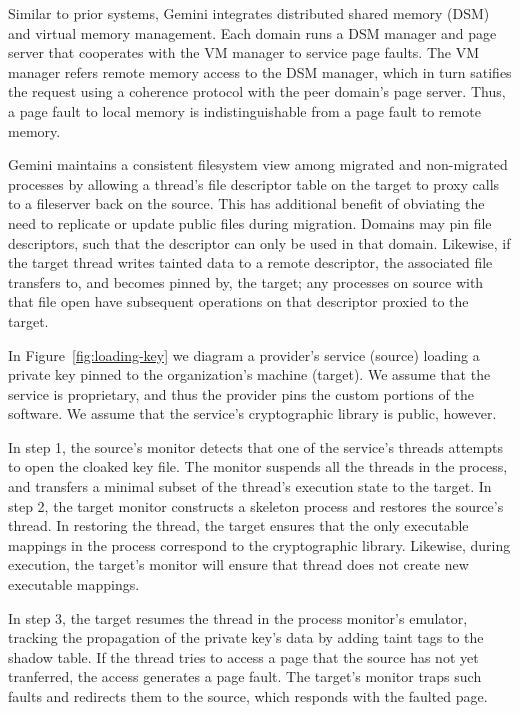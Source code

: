 %
Similar to prior systems, Gemini integrates distributed shared memory (DSM) and
virtual memory management.
%
Each domain runs a DSM manager and page server that cooperates with the VM
manager to service page faults.
%
The VM manager refers remote memory access to the DSM manager,
which in turn satifies the request using a coherence protocol with the peer
domain's page server.
%
Thus, a page fault to local memory is indistinguishable from a page fault to
remote memory.


%
Gemini maintains a consistent filesystem view among migrated and
non-migrated processes by allowing a thread's file descriptor table on the
target to proxy calls to a fileserver back on the source.
%
This has additional benefit of obviating the need to replicate or update
public files during migration.
%
Domains may pin file descriptors, such that the descriptor can only be used
in that domain.
%
Likewise, if the target thread writes tainted data to a remote descriptor, the
associated file transfers to, and becomes pinned by, the target; any processes
on source with that file open have subsequent operations on that descriptor
proxied to the target.


%
In Figure~\ref{fig:loading-key} we diagram a provider's service (source) loading
a private key pinned to the organization's machine (target).
%
We assume that the service is proprietary, and thus the provider
pins the custom portions of the software.
%
We assume that the service's cryptographic library is public, however.


In step 1, the source's monitor detects that one of the service's threads
attempts to open the cloaked key file.
%
The monitor suspends all the threads in the process, and transfers a minimal
subset of the thread's execution state to the target.
%
In step 2, the target monitor constructs a skeleton process and
restores the source's thread.
%
In restoring the thread, the target ensures that the only executable mappings
in the process correspond to the cryptographic library.
%
Likewise, during execution, the target's monitor will ensure that thread does
not create new executable mappings.


In step 3, the target resumes the thread in the process monitor's emulator,
tracking the propagation of the private key's data by adding taint tags to
the shadow table.
%
If the thread tries to access a page that the source has not yet tranferred,
the access generates a page fault.
%
The target's monitor traps such faults and redirects them to the source, which
responds with the faulted page.



